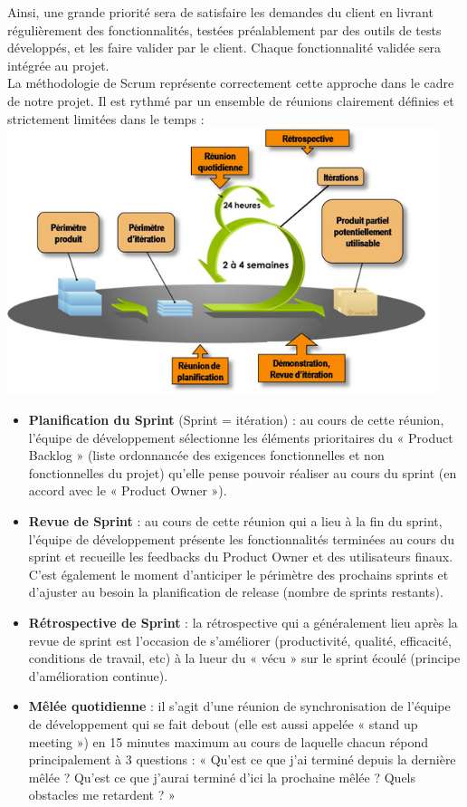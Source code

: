\documentclass[a4paper,11pt,french]{article}
\begin{document}
Ainsi, une grande priorité sera de satisfaire les demandes du client en livrant régulièrement des fonctionnalités, testées préalablement par des outils de tests développés, et les faire valider par le client. Chaque fonctionnalité validée sera intégrée au projet.\\

La méthodologie de Scrum représente correctement cette approche dans le cadre de notre projet. Il est rythmé par un ensemble de réunions clairement définies et strictement limitées dans le temps :\\

\includegraphics[width=34em]{scrum-agiles.jpg}


\newpage

\begin{itemize}
\item \textbf{Planification du Sprint} (Sprint = itération) : au cours de cette réunion, l’équipe de développement sélectionne les éléments prioritaires du « Product Backlog » (liste ordonnancée des exigences fonctionnelles et non fonctionnelles du projet) qu’elle pense pouvoir réaliser au cours du sprint (en accord avec le « Product Owner »).
\item \textbf{Revue de Sprint} : au cours de cette réunion qui a lieu à la fin du sprint, l’équipe de développement présente les fonctionnalités terminées au cours du sprint et recueille les feedbacks du Product Owner et des utilisateurs finaux. C’est également le moment d’anticiper le périmètre des prochains sprints et d’ajuster au besoin la planification de release (nombre de sprints restants).
\item \textbf{Rétrospective de Sprint} : la rétrospective qui a généralement lieu après la revue de sprint est l’occasion de s’améliorer (productivité, qualité, efficacité, conditions de travail, etc) à la lueur du « vécu » sur le sprint écoulé (principe d’amélioration continue).
\item \textbf{Mêlée quotidienne} : il s’agit d’une réunion de synchronisation de l’équipe de développement qui se fait debout (elle est aussi appelée « stand up meeting ») en 15 minutes maximum au cours de laquelle chacun répond principalement à 3 questions : « Qu’est ce que j’ai terminé depuis la dernière mêlée ? Qu’est ce que j’aurai terminé d’ici la prochaine mêlée ? Quels obstacles me retardent ? »
\end{itemize}
\end{document}
